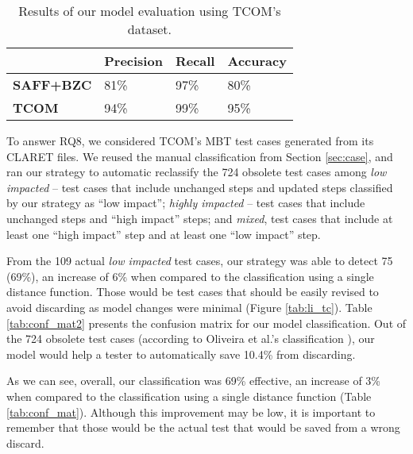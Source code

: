 \begin{table}[]
\centering
\caption{Results of our model evaluation using TCOM's dataset.}
\label{tab:tcomEval}
\begin{tabular}{|l|l|l|l|}
\hline
     & \textbf{Precision} & \textbf{Recall} & \textbf{Accuracy} \\ \hline
\textbf{SAFF+BZC} &     81\%      &      97\%    &     80\%         \\  \hline
\textbf{TCOM} &     94\%      &      99\%    &     95\%         \\  \hline
\end{tabular}
\end{table}

To answer RQ8, we considered TCOM’s MBT test cases generated from its CLARET files. We reused the manual classification from Section \ref{sec:case}, and ran our strategy to automatic reclassify the 724 obsolete test cases among \textit{low impacted} – test cases that include unchanged steps and updated steps classified by our strategy as ``low impact''; \textit{highly impacted} – test cases that include unchanged steps and ``high impact'' steps; and \textit{mixed}, test cases that include at least one ``high impact'' step and at least one ``low impact'' step.



From the 109 actual \textit{low impacted} test cases, our strategy was able to detect 75 (69\%), an increase of 6\% when compared to the classification using a single distance function. Those would be test cases that should be easily revised to avoid discarding as model changes were minimal (Figure \ref{tab:li_tc}). Table \ref{tab:conf_mat2} presents the confusion matrix for our model classification. Out of the 724 obsolete test cases (according to Oliveira et al.’s classification \citep{de2016full}), our model would help a tester to automatically save 10.4\% from discarding. 

As we can see, overall, our classification was 69\% effective, an increase of 3\% when compared to the classification using a single distance function (Table \ref{tab:conf_mat}). Although this improvement may be low, it is important to remember that those would be the actual test that would be saved from a wrong discard.

